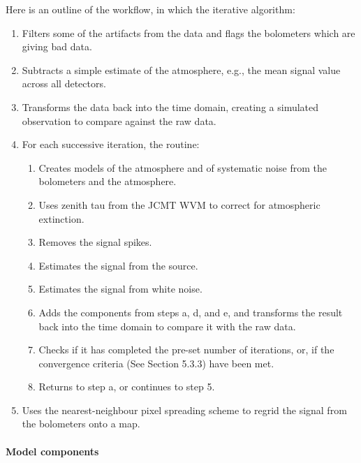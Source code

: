 \documentclass[twoside,11pt]{article}
\renewcommand{\_}{\texttt{\symbol{95}}}
\begin{document}
Here is an outline of the workflow, in which the iterative algorithm:
\begin{enumerate}
\item Filters some of the artifacts from the data and flags the
  bolometers which are giving bad data.
\item Subtracts a simple estimate of the atmosphere, e.g., the mean
  signal value across all detectors.
\item Transforms the data back into the time domain, creating a
  simulated observation to compare against the raw data.
\item For each successive iteration, the routine:
  \begin{enumerate}
    \item Creates models of the atmosphere and of systematic noise
      from the bolometers and the atmosphere.
    \item Uses zenith tau from the JCMT WVM to correct for atmospheric
      extinction.
    \item Removes the signal spikes.
    \item Estimates the signal from the source.
    \item Estimates the signal from white noise.
    \item Adds the components from steps a, d, and e, and transforms
      the result back into the time domain to compare it with the raw
      data.
    \item Checks if it has completed the pre-set number of iterations,
      or, if the convergence criteria (See Section 5.3.3) have been
      met.
    \item Returns to step a, or continues to step 5.
  \end{enumerate}
\item Uses the nearest-neighbour pixel spreading scheme to regrid the
  signal from the bolometers onto a map.
\end{enumerate}

\paragraph{Model components}
\end{document}
